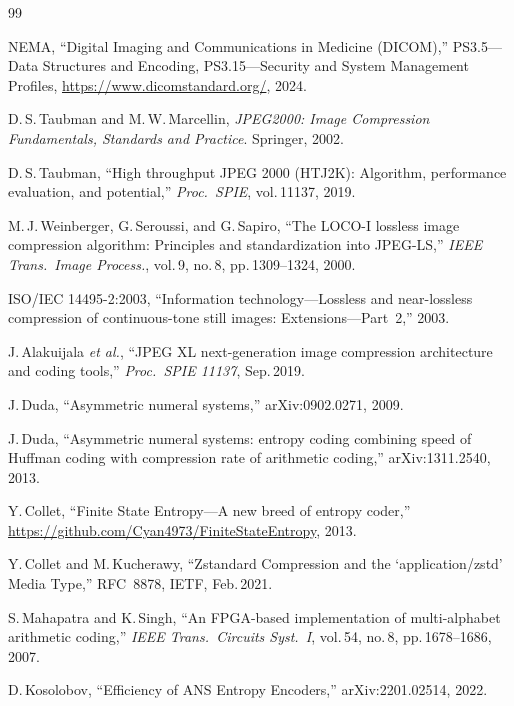 \documentclass[journal]{IEEEtran}
\begin{document}

\begin{thebibliography}{99}

NEMA, ``Digital Imaging and Communications in Medicine (DICOM),''
PS3.5---Data Structures and Encoding, PS3.15---Security and System Management
Profiles,
\url{https://www.dicomstandard.org/}, 2024.

D.\,S.\,Taubman and M.\,W.\,Marcellin,
\textit{JPEG2000: Image Compression Fundamentals, Standards and Practice}.
Springer, 2002.

D.\,S.\,Taubman, ``High throughput JPEG 2000 (HTJ2K): Algorithm, performance
evaluation, and potential,'' \textit{Proc.\ SPIE}, vol.\,11137, 2019.

M.\,J.\,Weinberger, G.\,Seroussi, and G.\,Sapiro,
``The LOCO-I lossless image compression algorithm: Principles and
standardization into JPEG-LS,''
\textit{IEEE Trans.\ Image Process.}, vol.\,9, no.\,8, pp.\,1309--1324, 2000.

ISO/IEC 14495-2:2003, ``Information technology---Lossless and near-lossless
compression of continuous-tone still images: Extensions---Part~2,'' 2003.

J.\,Alakuijala \textit{et al.},
``JPEG XL next-generation image compression architecture and coding tools,''
\textit{Proc.\ SPIE 11137}, Sep.\,2019.

J.\,Duda, ``Asymmetric numeral systems,'' arXiv:0902.0271, 2009.

J.\,Duda, ``Asymmetric numeral systems: entropy coding combining speed of
Huffman coding with compression rate of arithmetic coding,''
arXiv:1311.2540, 2013.

Y.\,Collet, ``Finite State Entropy---A new breed of entropy coder,''
\url{https://github.com/Cyan4973/FiniteStateEntropy}, 2013.

Y.\,Collet and M.\,Kucherawy,
``Zstandard Compression and the `application/zstd' Media Type,''
RFC~8878, IETF, Feb.\,2021.


S.\,Mahapatra and K.\,Singh,
``An FPGA-based implementation of multi-alphabet arithmetic coding,''
\textit{IEEE Trans.\ Circuits Syst.\ I}, vol.\,54, no.\,8, pp.\,1678--1686,
2007.

D.\,Kosolobov, ``Efficiency of ANS Entropy Encoders,''
arXiv:2201.02514, 2022.


\end{thebibliography}
\end{document}
